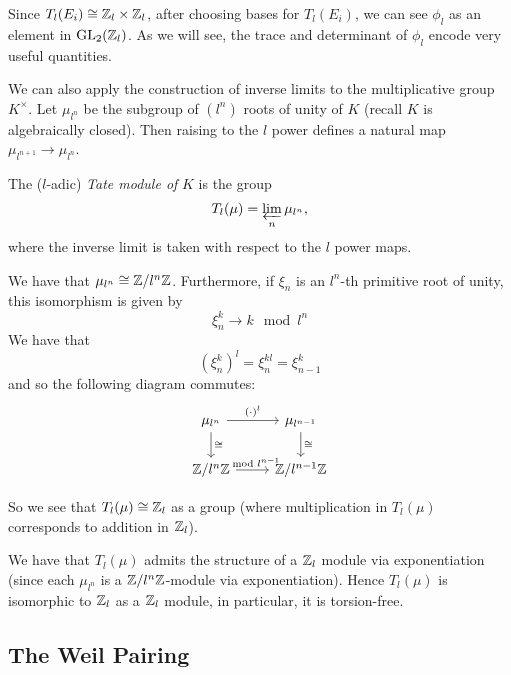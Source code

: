 Since $T_l(E_i) \cong \mathbb{Z}_l\times \mathbb{Z}_l$, after choosing bases for
$T_l(E_i)$, we can see $\phi_l$ as an element in
$\operatorname{GL}_2(\mathbb{Z}_l)$.
As we will see, the trace and determinant of $\phi_l$ encode
very useful quantities. 

We can also apply the construction of inverse limits
to the multiplicative group $K^\times$.
Let $\mu_{l^n}$ be the subgroup of $(l^n)$ roots of unity of $K$
(recall $K$ is algebraically closed). Then raising to the $l$
power defines a natural map $\mu_{l^{n+1}} \to \mu_{l^n}$.


\begin{definition}
	The ($l$-adic) \emph{Tate module of} $K$ is the group
	\begin{equation*}
		T_l(\mu) = \varprojlim_n \mu_{l^n},
	\end{equation*}
	where the inverse limit is taken with respect to the $l$
	power maps.
\end{definition}

We have that $\mu_{l^n} \cong \mathbb{Z}/l^n\mathbb{Z}$. Furthermore, if $\xi_n$ is an $l^n$-th
primitive root of unity, this isomorphism is given by
\begin{equation*}
	\xi_n^k \to k \mod l^n
\end{equation*}
We have that
\begin{equation*}
	(\xi_n^k)^l = \xi_n^{kl} = \xi_{n-1}^k
\end{equation*}
and so the following diagram commutes:
\begin{equation*}
\begin{tikzcd}
\mu_{l^n} \arrow[d, "\cong"] \arrow[r, "(\cdot)^l"] & \mu_{l^{n-1}}
\arrow[d,"\cong"] \\
\Z/l^n\Z \arrow[r, "\mod l^{n-1}"]         & \Z/l^{n-1}\Z           
\end{tikzcd}
\end{equation*}

So we see that $T_l(\mu) \cong \mathbb{Z}_l$
as a group (where multiplication in $T_l(\mu)$ corresponds to addition in
$\mathbb{Z}_l$).

We have that $T_l(\mu)$ admits the structure of a $\mathbb{Z}_l$ module
via exponentiation (since
each $\mu_{l^n}$ is a $\mathbb{Z}/l^n\mathbb{Z}$-module via exponentiation).
Hence $T_l(\mu)$ is isomorphic to $\mathbb{Z}_l$ as a $\mathbb{Z}_l$ module,
in particular, it is torsion-free.

\subsection{The Weil Pairing}


